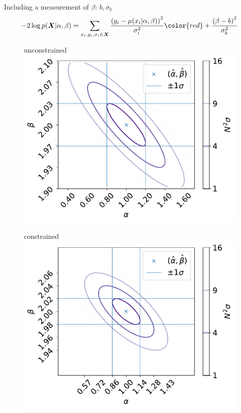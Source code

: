 \documentclass[
aspectratio=169,
14pt,
professionalfonts
]{beamer}
\begin{document}
\begin{frame}{Including a measurement of $\beta$: $b, \sigma_{b}$}
\vspace{-1cm}
    $$ -2\log p(\boldsymbol{X}|\alpha, \beta) = \sum_{x_i, y_i,\sigma_i \in \boldsymbol{X}}\frac{\left(y_i -\mu(x_i|\alpha, \beta)\right)^2}{\sigma_i^2} \color{red} + \frac{\left(\beta -b\right)^2}{\sigma_{b}^2} $$
    \begin{minipage}{0.49\textwidth}
        \begin{figure}
            \centering
            unconstrained
            \includegraphics[width=0.9\linewidth]{../plots/nll_unconstr.pdf}
        \end{figure}
    \end{minipage}
    \begin{minipage}{0.49\textwidth}
        \begin{figure}
            \centering
            \color{red}constrained
            \includegraphics[width=0.9\linewidth]{../plots/nll_constr.pdf}
        \end{figure}
    \end{minipage}

\end{frame}
\end{document}
